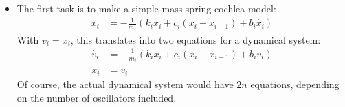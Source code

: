 

\begin{itemize}
\item The first task is to make a simple mass-spring cochlea model:
\begin{align*}
	\ddot{x_i} &= - \frac{1}{m_i} \left( k_i x_i + c_i (x_i-x_{i-1}) + b_i \dot{x_i} \right)
\end{align*}
With $v_i=\dot{x_i}$, this translates into two equations for a dynamical system:
\begin{align*}
	\dot{v_i} &= - \frac{1}{m_i} \left( k_i x_i + c_i (x_i-x_{i-1}) + b_i v_i \right) \\
	\dot{x_i} &= v_i
\end{align*}
Of course, the actual dynamical system would have $2n$ equations, depending on the number
of oscillators included.
\end{itemize}


